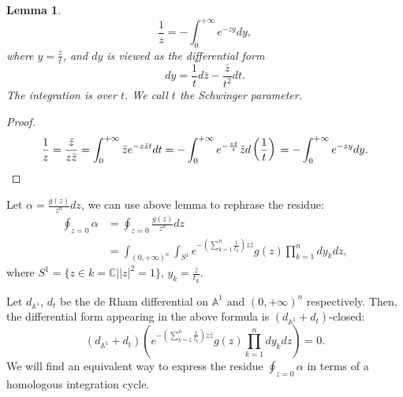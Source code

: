 \documentclass[11pt]{amsart}
\newtheorem{lem}[thm]{Lemma}
\theoremstyle{definition}
\theoremstyle{remark}
\numberwithin{equation}{section}
\renewcommand{\AA}{\mathbb{A}}
\begin{document}
\begin{lem}
    $$
    \frac{1}{z}=-\int_{0}^{+\infty}e^{-zy}dy,
    $$
    where $y=\frac{\bar{z}}{t}$, and $dy$ is viewed as the differential form $$dy=\frac{1}{t} d\bar{z}-\frac{\bar{z}}{t^2} d t.$$
    The integration is over $t$. We call $t$ the Schwinger parameter.
\end{lem}
\begin{proof}
  \begin{equation}
        \frac{1}{z} =\frac{\bar{z}}{z\bar{z}}\\
    =
\int_{0}^{+\infty}\bar{z}e^{-z\bar{z}t}dt\\
        =
        -\int_{0}^{+\infty}e^{-\frac{z\bar{z}}{t}}\bar{z}d\left(\frac{1}{t}\right)\\
        =
-\int_{0}^{+\infty}e^{-zy}dy.
\end{equation}
\end{proof}

Let $\alpha=\frac{g(z)}{z^{n}}dz$, we can use above lemma to rephrase the residue:
\begin{align*}
\oint_{z=0}\alpha
&=
\oint_{z=0}\frac{g(z)}{z^{n}}dz \\
&=
\int_{(0,+\infty)^{n}}\int_{S^{1}}e^{-\left(\sum_{k=1}^{n}\frac{1}{t_{k}}\right)z\bar{z}}g(z)\prod_{k=1}^{n}dy_{k}dz,
\end{align*}
where $S^{1}=\{z\in k=\mathbb{C}||z|^2=1\}$, $y_{k}=\frac{\bar{z}}{t_{k}}$.

Let $d_{\mathbb{A}^{1}}$, $d_{t}$ be the de Rham differential on $\mathbb{A}^{1}$ and $(0,+\infty)^{n}$ respectively.
Then, the differential form appearing in the above formula is $(d_{\AA^{1}} + d_{t})$-closed:
$$
(d_{\mathbb{A}^{1}}+d_{t}) \left(e^{-\left(\sum_{k=1}^{n}\frac{1}{t_{k}}\right)z\bar{z}}g(z)\prod_{k=1}^{n}dy_{k}dz\right)=0.
$$
We will find an equivalent way to express the residue $\oint_{z=0} \alpha$ in terms of a homologous integration cycle.
\end{document}
